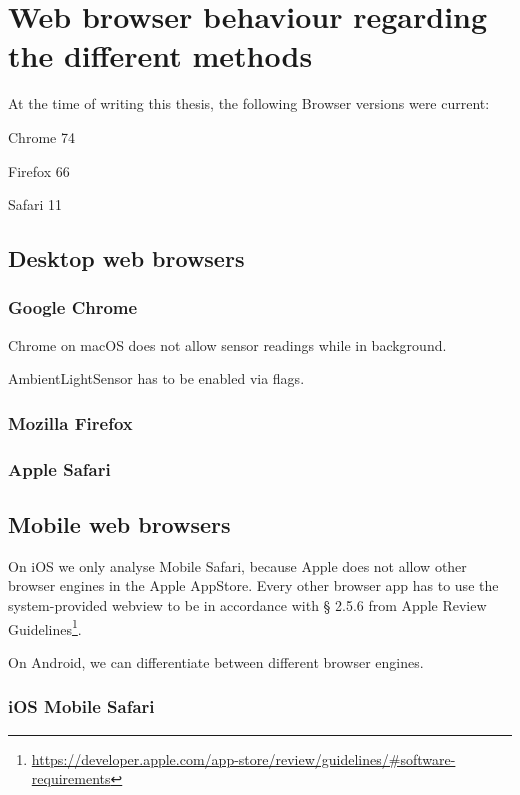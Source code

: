\documentclass[article,type=bsc,colorback,accentcolor=tud9c]{tudthesis}
\begin{document}
  \newpage
  \section{Web browser behaviour regarding the different methods}

  At the time of writing this thesis, the following Browser versions were current:

  Chrome 74
  
  Firefox 66
  
  Safari 11

  
  \subsection{Desktop web browsers}

  \subsubsection{Google Chrome}

  Chrome on macOS does not allow sensor readings while in background.

  AmbientLightSensor has to be enabled via flags.
  
  \subsubsection{Mozilla Firefox}

  \subsubsection{Apple Safari}

  \subsection{Mobile web browsers}

  On iOS we only analyse Mobile Safari, because Apple does not allow other browser engines in the Apple AppStore. Every other browser app has to use the system-provided webview to be in accordance with § 2.5.6 from Apple Review Guidelines\footnote{\url{https://developer.apple.com/app-store/review/guidelines/\#software-requirements}}.

  On Android, we can differentiate between different browser engines.

  \subsubsection{iOS Mobile Safari}
\end{document}
